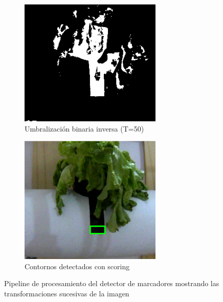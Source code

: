 \begin{figure}[H]
\vspace{0.3cm}

\begin{subfigure}[b]{0.48\textwidth}
    \centering
    \includegraphics[width=\textwidth]{imagenes/detector_marcadores_3_binario.png}
    \caption{Umbralización binaria inversa (T=50)}
\end{subfigure}
\hfill
\begin{subfigure}[b]{0.48\textwidth}
    \centering
    \includegraphics[width=\textwidth]{imagenes/detector_marcadores_4_contornos.png}
    \caption{Contornos detectados con scoring}
\end{subfigure}

\caption{Pipeline de procesamiento del detector de marcadores mostrando las transformaciones sucesivas de la imagen}
\label{fig:proceso_marcadores}
\end{figure}
